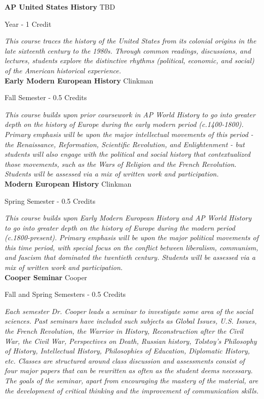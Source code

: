 \noindent\textbf{AP United States History} \hfill TBD

\noindent Year - 1 Credit

\vspace{1mm}\emph{This course traces the history of the United States from its colonial origins in the late sixteenth century to the 1980s. Through common readings, discussions, and lectures, students explore the distinctive rhythms (political, economic, and social) of the American historical experience. }\\


\noindent\textbf{Early Modern European History} \hfill Clinkman

\noindent Fall Semester - 0.5 Credits

\vspace{1mm}\emph{This course builds upon prior coursework in AP World History to go into greater depth on the history of Europe during the early modern period (c.1400-1800). Primary emphasis will be upon the major intellectual movements of this period - the Renaissance, Reformation, Scientific Revolution, and Enlightenment - but students will also engage with the political and social history that contextualized those movements, such as the Wars of Religion and the French Revolution. Students will be assessed via a mix of written work and participation.}\\


\noindent\textbf{Modern European History} \hfill Clinkman

\noindent Spring Semester - 0.5 Credits

\vspace{1mm}\emph{This course builds upon Early Modern European History and AP World History to go into greater depth on the history of Europe during the modern period (c.1800-present). Primary emphasis will be upon the major political movements of this time period, with special focus on the conflict between liberalism, communism, and fascism that dominated the twentieth century. Students will be assessed via a mix of written work and participation.}\\


\noindent\textbf{Cooper Seminar} \hfill Cooper

\noindent Fall and Spring Semesters - 0.5 Credits

\vspace{1mm}\emph{Each semester Dr. Cooper leads a seminar to investigate some area of the social sciences. Past seminars have included such subjects as Global Issues, U.S. Issues, the French Revolution, the Warrior in History, Reconstruction after the Civil War, the Civil War, Perspectives on Death, Russian history, Tolstoy’s Philosophy of History, Intellectual History, Philosophies of Education, Diplomatic History, etc. Classes are structured around class discussion and assessments consist of four major papers that can be rewritten as often as the student deems necessary. The goals of the seminar, apart from encouraging the mastery of the material, are the development of critical thinking and the improvement of communication skills.}\\


